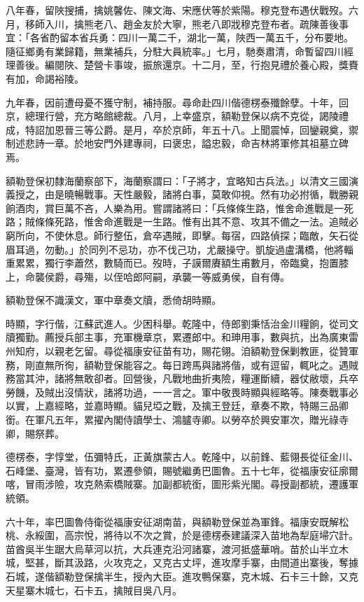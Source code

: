\begin{pinyinscope}
八年春，留陜搜捕，擒姚馨佐、陳文海、宋應伏等於紫陽。穆克登布遇伏戰歿。六月，移師入川，擒熊老八、趙金友於大寧，熊老八即戕穆克登布者。疏陳善後事宜：「各省酌留本省兵勇：四川一萬二千，湖北一萬，陜西一萬五千，分布要地。隨征鄉勇有業歸籍，無業補兵，分駐大員統率。」七月，馳奏肅清，命暫留四川經理善後。編閱陜、楚營卡事竣，振旅還京。十二月，至，行抱見禮於養心殿，獎賚有加，命謁裕陵。

九年春，因前遭母憂不獲守制，補持服。尋命赴四川偕德楞泰殲餘孽。十年，回京，總理行營，充方略館總裁。八月，上幸盛京，額勒登保以病不克從，謁陵禮成，特詔加恩晉三等公爵。是月，卒於京師，年五十八。上聞震悼，回鑾親奠，禦制述悲詩一章。於地安門外建專祠，曰褒忠，謚忠毅，命吉林將軍修其祖墓立碑焉。

額勒登保初隸海蘭察部下，海蘭察謂曰：「子將才，宜略知古兵法。」以清文三國演義授之，由是曉暢戰事。天性嚴毅，諸將白事，莫敢仰視。然有功必拊循，戰勝親餉酒肉，賞巨萬不吝，人樂為用。嘗謂諸將曰：「兵條條生路，惟舍命進戰是一死路；賊條條死路，惟舍命進戰是一生路。惟有出其不意、攻其不備之一法。追賊必窮所向，不使休息。師行整伍，倉卒遇賊，即擊。每宿，四路偵探；臨敵，矢石從眉耳過，勿動。」於同列不忌功，亦不伐己功，尤嚴操守。凱旋過盧溝橋，他將輜重累累，獨行李蕭然，數騎而已。歿時，子謨爾賡額生甫數月，帝臨奠，抱置膝上，命襲侯爵，尋殤，以侄哈郎阿嗣，承襲一等威勇侯，自有傳。

額勒登保不識漢文，軍中章奏文牘，悉倚胡時顯。

時顯，字行偕，江蘇武進人。少困科舉。乾隆中，侍郎劉秉恬治金川糧餉，從司文牘獨勤。薦授兵部主事，充軍機章京，累遷郎中。和珅用事，數與抗，出為廣東雷州知府，以親老乞留。尋從福康安征苗有功，賜花翎。洎額勒登保剿教匪，從贊軍務，剛直無所徇，額勒登保能容之。每日跨馬與諸將偕，或有逗留，輒叱之。遇賊務當其沖，諸將無敢卻者。回營後，凡戰地曲折夷險，糧運斷續，器仗敝壞，兵卒勞饑，及賊出沒情狀，諸將功過，一一言之。軍中敬畏時顯與經略等。陳奏戰事必以實，上嘉經略，並嘉時顯。貓兒埡之戰，及擒王登廷，章奏不欺，特賜三品卿銜。在軍凡五年，累擢內閣侍讀學士、鴻臚寺卿。以勞卒於興安軍次，贈光祿寺卿，賜祭葬。

德楞泰，字惇堂，伍彌特氏，正黃旗蒙古人。乾隆中，以前鋒、藍翎長從征金川、石峰堡、臺灣，皆有功，累遷參領，賜號繼勇巴圖魯。五十七年，從福康安征廓爾喀，冒雨涉險，攻克熱索橋賊寨。加副都統銜，圖形紫光閣。尋授副都統，遷護軍統領。

六十年，率巴圖魯侍衛從福康安征湖南苗，與額勒登保並為軍鋒。福康安既解松桃、永綏圍，高宗悅，將待以不次之賞，於是德楞泰建議深入苗地為犁庭埽穴計。苗酋吳半生踞大烏草河以抗，大兵連克沿河諸寨，渡河抵盛華哨。苗於山半立木城，堅甚，斷其汲路，火攻克之，又克古丈坪，進攻摩手寨，由間道出寨後，奪據石城，遂偕額勒登保擒半生，授內大臣。進攻鴨保寨，克木城、石卡三十餘，又克天星寨木城七，石卡五，擒賊目吳八月。


\end{pinyinscope}
